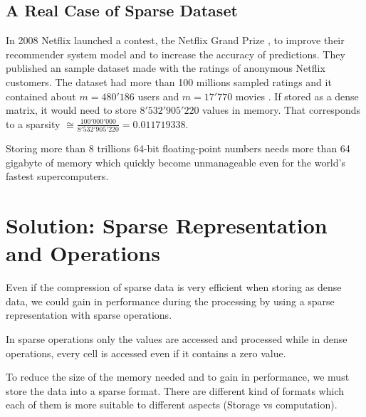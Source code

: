 \subsection{A Real Case of Sparse Dataset}
In 2008 Netflix launched a contest, the Netflix Grand Prize \cite{netflixgrandprize}, to improve their recommender system model and to increase the accuracy of predictions. They published an sample dataset made with the ratings of anonymous Netflix customers. The dataset had more than 100 millions sampled ratings and it contained about $m=480'186$ users and $m=17'770$ movies \cite{Koren091the}. If stored as a dense matrix, it would need to store $8'532'905'220$ values in memory. That corresponds to a sparsity $\cong \frac{100'000'000}{8'532'905'220} = 0.011719338$.

Storing more than 8 trillions 64-bit floating-point numbers needs more than 64 gigabyte of memory which quickly become unmanageable even for the world's fastest supercomputers. 

\section{Solution: Sparse Representation and Operations}
Even if the compression of sparse data is very efficient when storing as dense data, we could gain in performance during the processing by using a sparse representation with sparse operations. 

In sparse operations only the values are accessed and processed while in dense operations, every cell is accessed even if it contains a zero value.

To reduce the size of the memory needed and to gain in performance, we must store the data into a sparse format. There are different kind of formats which each of them is more suitable to different aspects (Storage vs computation).





